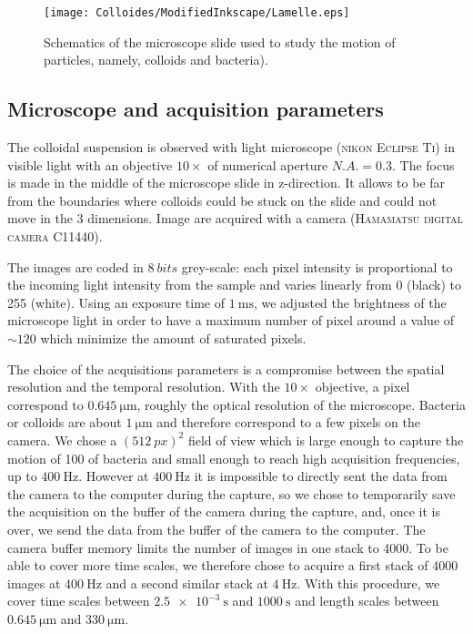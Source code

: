 \documentclass[%
 aip,
 jmp,%
 amsmath,amssymb,
reprint,%
]{revtex4-1}
\begin{document}
\begin{figure}
\texttt{[image: Colloides/ModifiedInkscape/Lamelle.eps]}
\caption{Schematics of the microscope slide used to study the motion of particles, namely, colloids and bacteria).}
\label{Slide}
\end{figure}

\subsection{Microscope and acquisition parameters}

The colloidal suspension is observed with light microscope (\textsc{nikon Eclipse Ti}) in visible light with an objective $10 \times$ of numerical aperture $N.A. = 0.3$. The focus is made in the middle of the microscope slide in z-direction. It allows to be far from the boundaries where colloids could be stuck on the slide and could not move in the 3 dimensions. Image are acquired with a camera (\textsc{Hamamatsu digital camera C11440}).

The images are coded in $\SI{8}{bits}$  grey-scale: each pixel intensity is proportional to the incoming light intensity from the sample and varies linearly from  0 (black) to 255 (white). Using an exposure time of $\SI{1}{\milli\second}$, we adjusted the brightness of the microscope light in order to have a maximum number of pixel around a value of $\sim 120$ which minimize the amount of saturated pixels.

The choice of the acquisitions parameters is a compromise between the spatial resolution and the temporal resolution. With the $10\times$ objective, a pixel correspond to $\SI{0.645}{\micro\meter}$, roughly the optical resolution of the microscope. Bacteria or colloids are about $\SI{1}{\micro\meter}$ and therefore correspond to a few pixels on the camera. We chose a $(\SI{512}{px})^2$ field of view which is large enough to capture the motion of 100 of bacteria and small enough to reach high acquisition frequencies, up to $\SI{400}{\hertz}$. However at $\SI{400}{\hertz}$ it is impossible to directly sent the data from the camera to the computer during the capture, so we chose to temporarily save the acquisition on the buffer of the camera during the capture, and, once it is over, we send the data from the buffer of the camera to the computer. The camera buffer memory limits the number of images in one stack to 4000. To be able to cover more time scales, we therefore chose to acquire a first stack of 4000 images at $\SI{400}{\hertz}$ and a second similar stack at $\SI{4}{\hertz}$. With this procedure, we cover time scales between $\SI{2.5e-3}{\second}$ and $\SI{1000}{\second}$ and length scales between $\SI{0.645}{\micro\meter}$ and $\SI{330}{\micro\meter}$.
\end{document}
